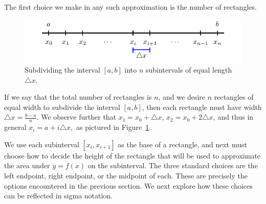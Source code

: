 The first choice we make in any such approximation is the number of rectangles.  
\begin{figure}[h]
\begin{center}
\includegraphics{figures/4_2_Interval}
\caption{Subdividing the interval $[a,b]$ into $n$ subintervals of equal length $\triangle x$.} \label{F:4.2.Interval}
\end{center}
\end{figure}
If we say that the total number of rectangles is $n$, and we desire $n$ rectangles of equal width to subdivide the interval $[a,b]$, then each rectangle must have width $\triangle x = \frac{b-a}{n}$. We observe further that $x_1 = x_0 + \triangle x$, $x_2 = x_0 + 2 \triangle x$, and thus in general $x_{i} = a + i\triangle x,$ as pictured in Figure~\ref{F:4.2.Interval}.

We use each subinterval $[x_i, x_{i+1}]$ as the base of a rectangle, and next must choose how to decide the height of the rectangle that will be used to approximate the area under $y = f(x)$ on the subinterval.  The three standard choices are the left endpoint, right endpoint, or the midpoint of each.  These are precisely the options encountered in the previous section.  We next explore how these choices can be reflected in sigma notation.

